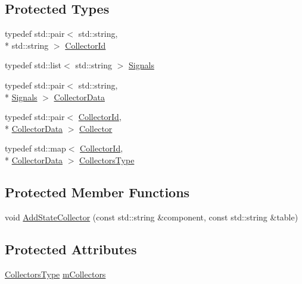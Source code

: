 \subsection*{Protected Types}
\begin{DoxyCompactItemize}
\item 
typedef std\-::pair$<$ std\-::string, \\*
std\-::string $>$ \hyperlink{classmts_collector_factory_adaeb0ec5b7392f2a011eb478334e86b6}{Collector\-Id}
\item 
typedef std\-::list$<$ std\-::string $>$ \hyperlink{classmts_collector_factory_a62e1c130f6074d6633efd23888e6b33f}{Signals}
\item 
typedef std\-::pair$<$ std\-::string, \\*
\hyperlink{classmts_collector_factory_a62e1c130f6074d6633efd23888e6b33f}{Signals} $>$ \hyperlink{classmts_collector_factory_aca25b6c09f469fe168d3fc99ef7aec8d}{Collector\-Data}
\item 
typedef std\-::pair$<$ \hyperlink{classmts_collector_factory_adaeb0ec5b7392f2a011eb478334e86b6}{Collector\-Id}, \\*
\hyperlink{classmts_collector_factory_aca25b6c09f469fe168d3fc99ef7aec8d}{Collector\-Data} $>$ \hyperlink{classmts_collector_factory_abe3e52266409a03bcf7ba68004ee08d2}{Collector}
\item 
typedef std\-::map$<$ \hyperlink{classmts_collector_factory_adaeb0ec5b7392f2a011eb478334e86b6}{Collector\-Id}, \\*
\hyperlink{classmts_collector_factory_aca25b6c09f469fe168d3fc99ef7aec8d}{Collector\-Data} $>$ \hyperlink{classmts_collector_factory_ae977f45bdbb0d62035689490d5bf54ee}{Collectors\-Type}
\end{DoxyCompactItemize}
\subsection*{Protected Member Functions}
\begin{DoxyCompactItemize}
\item 
void \hyperlink{classmts_collector_factory_a6cf61433ca47519803c8b2db3bbf9cdd}{Add\-State\-Collector} (const std\-::string \&component, const std\-::string \&table)
\end{DoxyCompactItemize}
\subsection*{Protected Attributes}
\begin{DoxyCompactItemize}
\item 
\hyperlink{classmts_collector_factory_ae977f45bdbb0d62035689490d5bf54ee}{Collectors\-Type} \hyperlink{classmts_collector_factory_a273acdf27438201813650b068c576d9b}{m\-Collectors}
\end{DoxyCompactItemize}
